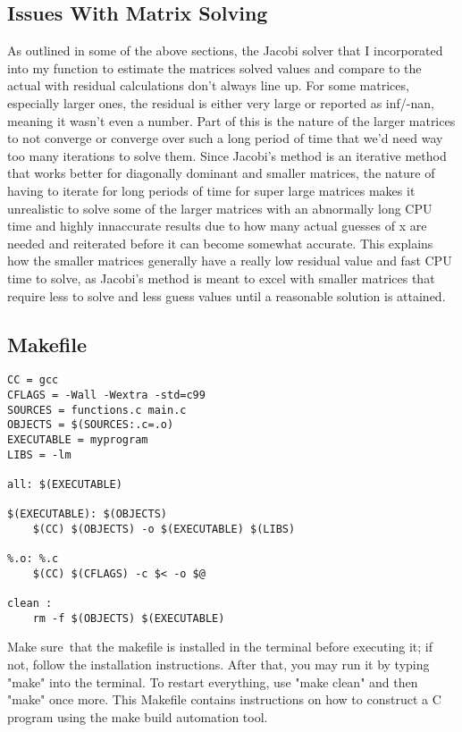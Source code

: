 \documentclass[12pt]{article}
\begin{document}
\subsection{Issues With Matrix Solving}
As outlined in some of the above sections, the Jacobi solver that I incorporated into my function to estimate the matrices solved values and compare to the actual with residual calculations don't always line up. For some matrices, especially larger ones, the residual is either very large or reported as inf/-nan, meaning it wasn't even a number. Part of this is the nature of the larger matrices to not converge or converge over such a long period of time that we'd need way too many iterations to solve them. 
\newline
Since Jacobi's method is an iterative method that works better for diagonally dominant and smaller matrices, the nature of having to iterate for long periods of time for super large matrices makes it unrealistic to solve some of the larger matrices with an abnormally long CPU time and highly innaccurate results due to how many actual guesses of x are needed and reiterated before it can become somewhat accurate. This explains how the smaller matrices generally have a really low residual value and fast CPU time to solve, as Jacobi's method is meant to excel with smaller matrices that require less to solve and less guess values until a reasonable solution is attained.

\subsection{Makefile}

\begin{lstlisting}
CC = gcc
CFLAGS = -Wall -Wextra -std=c99
SOURCES = functions.c main.c
OBJECTS = $(SOURCES:.c=.o)
EXECUTABLE = myprogram
LIBS = -lm

all: $(EXECUTABLE)

$(EXECUTABLE): $(OBJECTS)
	$(CC) $(OBJECTS) -o $(EXECUTABLE) $(LIBS)

%.o: %.c
	$(CC) $(CFLAGS) -c $< -o $@

clean :
	rm -f $(OBJECTS) $(EXECUTABLE)
\end{lstlisting}

Make sure that the makefile is installed in the terminal before executing it; if not, follow the installation instructions. After that, you may run it by typing "make" into the terminal. To restart everything, use "make clean" and then "make" once more. This Makefile contains instructions on how to construct a C program using the make build automation tool. 
\end{document}
